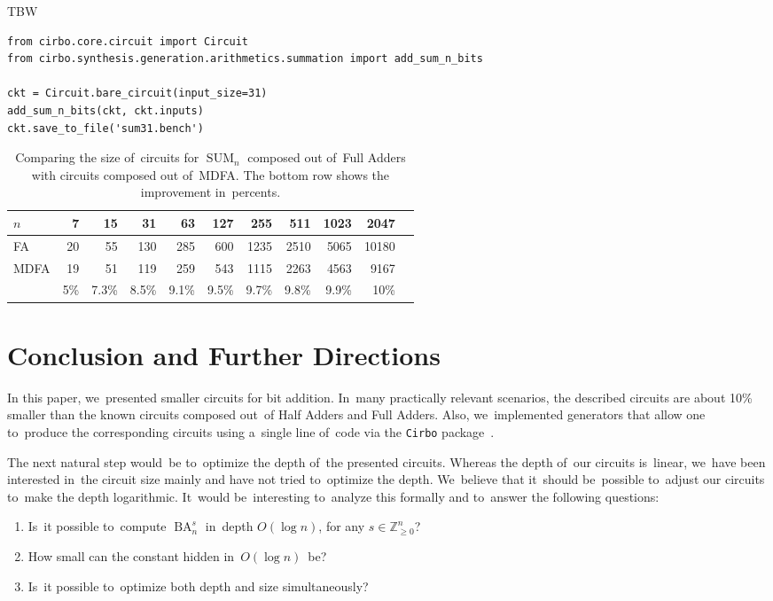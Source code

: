 \documentclass[sigconf, review, anonymous]{acmart}
\DeclareMathOperator{\SUM}{SUM}
\DeclareMathOperator{\BA}{BA}
\begin{document}
\begin{listing}
	\caption{TBW}
	\label{listing:first}
	\begin{lstlisting}
from cirbo.core.circuit import Circuit
from cirbo.synthesis.generation.arithmetics.summation import add_sum_n_bits

ckt = Circuit.bare_circuit(input_size=31)
add_sum_n_bits(ckt, ckt.inputs)
ckt.save_to_file('sum31.bench')
	\end{lstlisting}
\end{listing}

\begin{table}
	\begin{center}
		\small
		\begin{tabular}{lrrrrrrrrrr}
			\toprule
			$n$ & 7 & 15 & 31 & 63 & 127 & 255 & 511 & 1023 & 2047 \\
			\midrule
			FA & 20 & 55 & 130 & 285 & 600 & 1235 & 2510 & 5065 & 10180 \\
			MDFA & 19 & 51 & 119 & 259 & 543 & 1115 & 2263 & 4563 & 9167 \\
			& 5\%  & 7.3\%  & 8.5\%  & 9.1\%  & 9.5\%  & 9.7\%  & 9.8\%  & 9.9\%  & 10\% \\
			\bottomrule
		\end{tabular}
	\end{center}
	\caption{Comparing the size of~circuits for $\SUM_n$ composed out of~Full Adders with
	circuits composed out of~MDFA. The bottom row shows the improvement in~percents.}
	\label{table:first}
\end{table}


\section{Conclusion and Further Directions}

In this paper, we~presented smaller circuits for bit addition.
In~many practically relevant scenarios, the described circuits
are about 10\% smaller than the known circuits composed
out~of Half Adders and Full Adders.
Also, we~implemented generators that allow one
to~produce the corresponding circuits using a~single line of~code
via the \texttt{Cirbo} package~\cite{DBLP:journals/corr/abs-2412-14933}.

The next natural step would~be to~optimize the depth of~the presented circuits.
Whereas the depth of~our circuits is~linear,
we~have been interested in~the circuit size mainly and
have not tried to~optimize the depth. We~believe that it~should be~possible
to~adjust our circuits to~make the depth logarithmic. It~would be~interesting
to~analyze this formally and to~answer the following questions:
\begin{enumerate}
	\item Is~it possible to~compute $\BA_n^s$ in~depth $O(\log n)$, for any $s \in \mathbb{Z}_{\ge 0}^n$?
	\item How small can the constant hidden in~$O(\log n)$~be?
	\item Is~it possible to~optimize both depth and size simultaneously?
\end{enumerate}




\end{document}
